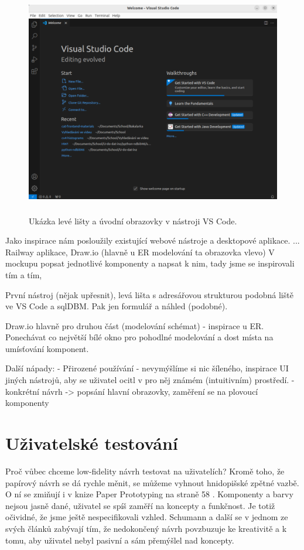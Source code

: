 \begin{figure}
  \centering
  \includegraphics[height=100mm]{../img/vs-code-uvod}
  \caption{Ukázka levé lišty a úvodní obrazovky v nástroji VS Code.}
  \label{obr05:vs-code-uvod}
\end{figure}

Jako inspirace nám posloužily existující webové nástroje a desktopové aplikace.  ... Railway aplikace, Draw.io (hlavně u ER modelování ta obrazovka vlevo) 
V mockupu popsat jednotlivé komponenty a napsat k nim, tady jsme se inspirovali tím a tím,

První nástroj (nějak upřesnit), levá lišta s adresářovou strukturou podobná liště ve VS Code a sqlDBM. Pak jen formulář a náhled (podobné).

Draw.io hlavně pro druhou část (modelování schémat) - inspirace u ER. Ponechávat co největší bílé okno pro pohodlné modelování a dost místa na umísťování komponent.

Další nápady:
- Přirozené používání - nevymýšlíme si nic šíleného, inspirace UI jiných nástrojů, aby se uživatel ocitl v pro něj známém (intuitivním) prostředí.
- konkrétní návrh -> popsání hlavní obrazovky, zaměření se na plovoucí komponenty

\section{Uživatelské testování}

Proč vůbec chceme low-fidelity návrh testovat na uživatelích? Kromě toho, že papírový návrh se dá rychle měnit, se můžeme vyhnout hnidopišské zpětné vazbě. O ní se zmiňují i v knize Paper Prototyping na straně 58 \cite{Paper_Prototyping}. Komponenty a barvy nejsou jasně dané, uživatel se spíš zaměří na koncepty a funkčnost. Je totiž očividné, že jsme ještě nespecifikovali vzhled. Schumann a další se v jednom ze svých článků \cite{Schumann_1996_AEN} zabývají tím, že nedokončený návrh povzbuzuje ke kreativitě a k tomu, aby uživatel nebyl pasivní a sám přemýšlel nad koncepty. 

